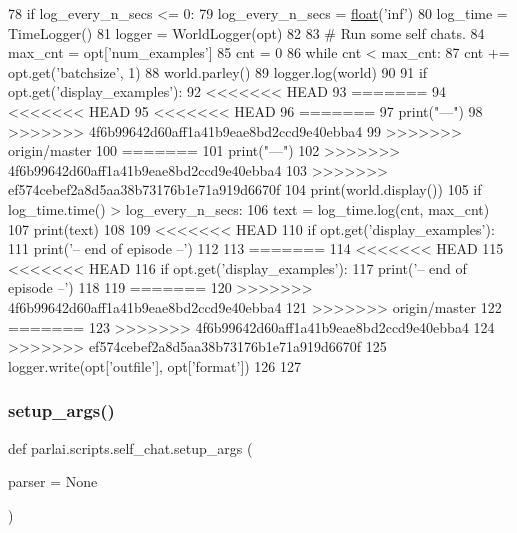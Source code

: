 \begin{DoxyCode}
78     \textcolor{keywordflow}{if} log\_every\_n\_secs <= 0:
79         log\_every\_n\_secs = \hyperlink{namespaceprojects_1_1controllable__dialogue_1_1make__control__dataset_aa2b7207688c641dbc094ab44eca27113}{float}(\textcolor{stringliteral}{'inf'})
80     log\_time = TimeLogger()
81     logger = WorldLogger(opt)
82 
83     \textcolor{comment}{# Run some self chats.}
84     max\_cnt = opt[\textcolor{stringliteral}{'num\_examples'}]
85     cnt = 0
86     \textcolor{keywordflow}{while} cnt < max\_cnt:
87         cnt += opt.get(\textcolor{stringliteral}{'batchsize'}, 1)
88         world.parley()
89         logger.log(world)
90 
91         \textcolor{keywordflow}{if} opt.get(\textcolor{stringliteral}{'display\_examples'}):
92 <<<<<<< HEAD
93 =======
94 <<<<<<< HEAD
95 <<<<<<< HEAD
96 =======
97             print(\textcolor{stringliteral}{"---"})
98 >>>>>>> 4f6b99642d60aff1a41b9eae8bd2ccd9e40ebba4
99 >>>>>>> origin/master
100 =======
101             print(\textcolor{stringliteral}{"---"})
102 >>>>>>> 4f6b99642d60aff1a41b9eae8bd2ccd9e40ebba4
103 >>>>>>> ef574cebef2a8d5aa38b73176b1e71a919d6670f
104             print(world.display())
105         \textcolor{keywordflow}{if} log\_time.time() > log\_every\_n\_secs:
106             text = log\_time.log(cnt, max\_cnt)
107             print(text)
108 
109 <<<<<<< HEAD
110     \textcolor{keywordflow}{if} opt.get(\textcolor{stringliteral}{'display\_examples'}):
111         print(\textcolor{stringliteral}{'-- end of episode --'})
112 
113 =======
114 <<<<<<< HEAD
115 <<<<<<< HEAD
116     \textcolor{keywordflow}{if} opt.get(\textcolor{stringliteral}{'display\_examples'}):
117         print(\textcolor{stringliteral}{'-- end of episode --'})
118 
119 =======
120 >>>>>>> 4f6b99642d60aff1a41b9eae8bd2ccd9e40ebba4
121 >>>>>>> origin/master
122 =======
123 >>>>>>> 4f6b99642d60aff1a41b9eae8bd2ccd9e40ebba4
124 >>>>>>> ef574cebef2a8d5aa38b73176b1e71a919d6670f
125     logger.write(opt[\textcolor{stringliteral}{'outfile'}], opt[\textcolor{stringliteral}{'format'}])
126 
127 
\end{DoxyCode}
\mbox{\label{namespaceparlai_1_1scripts_1_1self__chat_a0899a6bf4e3d48c81a2c1b97f9696714}} 
\subsubsection{\texorpdfstring{setup\+\_\+args()}{setup\_args()}}
{\footnotesize\ttfamily def parlai.\+scripts.\+self\+\_\+chat.\+setup\+\_\+args (\begin{DoxyParamCaption}\item[{}]{parser = {\ttfamily None} }\end{DoxyParamCaption})}



